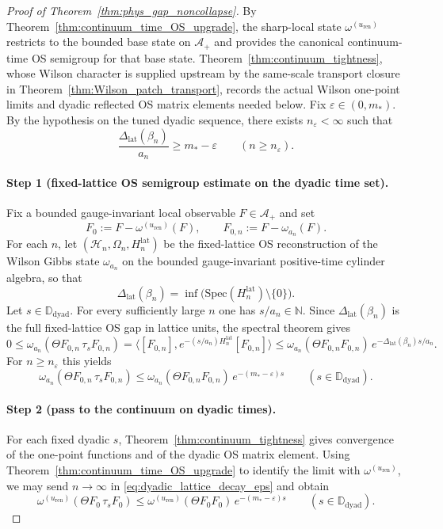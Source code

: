 \begin{proof}[Proof of Theorem~\ref{thm:phys_gap_noncollapse}]
By Theorem~\ref{thm:continuum_time_OS_upgrade}, the sharp-local state $\omega^{(u_{\mathrm{ren}})}$ restricts to the bounded base state on $\mathcal A_+$ and provides the canonical continuum-time OS semigroup for that base state.
Theorem~\ref{thm:continuum_tightness}, whose Wilson character is supplied upstream by the same-scale transport closure in Theorem~\ref{thm:Wilson_patch_transport}, records the actual Wilson one-point limits and dyadic reflected OS matrix elements needed below.
Fix $\varepsilon\in(0,m_*)$.
By the hypothesis on the tuned dyadic sequence, there exists $n_\varepsilon<\infty$ such that
\[
\frac{\Delta_{\mathrm{lat}}(\beta_n)}{a_n}\ge m_*-\varepsilon
\qquad (n\ge n_\varepsilon).
\]

\paragraph{Step 1 (fixed-lattice OS semigroup estimate on the dyadic time set).}
Fix a bounded gauge-invariant local observable $F\in\mathcal A_+$ and set
\[
F_0:=F-\omega^{(u_{\mathrm{ren}})}(F),
\qquad
F_{0,n}:=F-\omega_{a_n}(F).
\]
For each $n$, let $(\mathcal H_n,\Omega_n,H_n^{\mathrm{lat}})$ be the fixed-lattice OS reconstruction of the Wilson Gibbs state $\omega_{a_n}$ on the bounded gauge-invariant positive-time cylinder algebra, so that
\[
\Delta_{\mathrm{lat}}(\beta_n)=\inf\bigl(\mathrm{Spec}(H_n^{\mathrm{lat}})\setminus\{0\}\bigr).
\]
Let $s\in\mathbb D_{\mathrm{dyad}}$.
For every sufficiently large $n$ one has $s/a_n\in\mathbb N$.
Since $\Delta_{\mathrm{lat}}(\beta_n)$ is the full fixed-lattice OS gap in lattice units, the spectral theorem gives
\[
0\le
\omega_{a_n}(\Theta F_{0,n}\,\tau_s F_{0,n})
=\langle [F_{0,n}],e^{-(s/a_n)H_n^{\mathrm{lat}}}[F_{0,n}]\rangle
\le
\omega_{a_n}(\Theta F_{0,n}F_{0,n})\,e^{-\Delta_{\mathrm{lat}}(\beta_n)s/a_n}.
\]
For $n\ge n_\varepsilon$ this yields
\begin{equation}
\omega_{a_n}(\Theta F_{0,n}\,\tau_s F_{0,n})
\le
\omega_{a_n}(\Theta F_{0,n}F_{0,n})\,e^{-(m_*-\varepsilon)s}
\qquad (s\in\mathbb D_{\mathrm{dyad}}).
\label{eq:dyadic_lattice_decay_eps}
\end{equation}

\paragraph{Step 2 (pass to the continuum on dyadic times).}
For each fixed dyadic $s$, Theorem~\ref{thm:continuum_tightness} gives convergence of the one-point functions and of the dyadic OS matrix element.
Using Theorem~\ref{thm:continuum_time_OS_upgrade} to identify the limit with $\omega^{(u_{\mathrm{ren}})}$, we may send $n\to\infty$ in \eqref{eq:dyadic_lattice_decay_eps} and obtain
\begin{equation}
\omega^{(u_{\mathrm{ren}})}(\Theta F_0\,\tau_s F_0)
\le
\omega^{(u_{\mathrm{ren}})}(\Theta F_0F_0)\,e^{-(m_*-\varepsilon)s}
\qquad (s\in\mathbb D_{\mathrm{dyad}}).
\label{eq:dyadic_cont_decay_eps}
\end{equation}


\end{proof}
